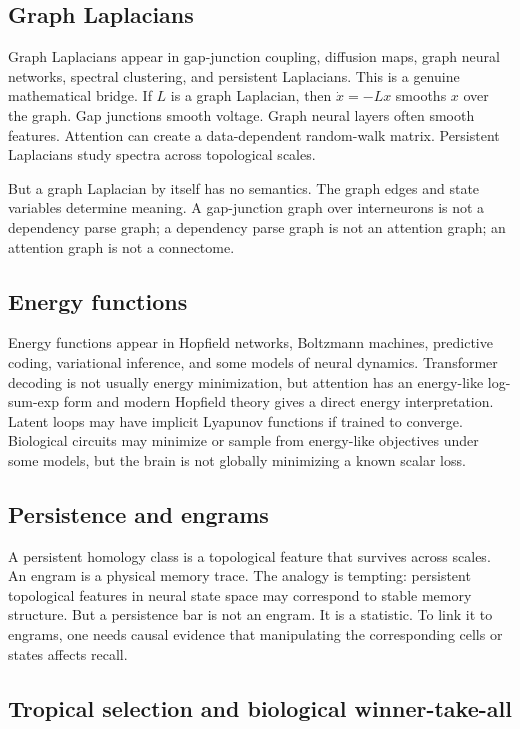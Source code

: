 \documentclass[11pt]{article}
\newcommand{\1}{\mathbf{1}}
\begin{document}
\subsection{Graph Laplacians}

Graph Laplacians appear in gap-junction coupling, diffusion maps, graph neural networks, spectral clustering, and persistent Laplacians. This is a genuine mathematical bridge. If $L$ is a graph Laplacian, then $\dot x=-Lx$ smooths $x$ over the graph. Gap junctions smooth voltage. Graph neural layers often smooth features. Attention can create a data-dependent random-walk matrix. Persistent Laplacians study spectra across topological scales.

But a graph Laplacian by itself has no semantics. The graph edges and state variables determine meaning. A gap-junction graph over interneurons is not a dependency parse graph; a dependency parse graph is not an attention graph; an attention graph is not a connectome.

\subsection{Energy functions}

Energy functions appear in Hopfield networks, Boltzmann machines, predictive coding, variational inference, and some models of neural dynamics. Transformer decoding is not usually energy minimization, but attention has an energy-like log-sum-exp form and modern Hopfield theory gives a direct energy interpretation. Latent loops may have implicit Lyapunov functions if trained to converge. Biological circuits may minimize or sample from energy-like objectives under some models, but the brain is not globally minimizing a known scalar loss.

\subsection{Persistence and engrams}

A persistent homology class is a topological feature that survives across scales. An engram is a physical memory trace. The analogy is tempting: persistent topological features in neural state space may correspond to stable memory structure. But a persistence bar is not an engram. It is a statistic. To link it to engrams, one needs causal evidence that manipulating the corresponding cells or states affects recall.

\subsection{Tropical selection and biological winner-take-all}
\end{document}
